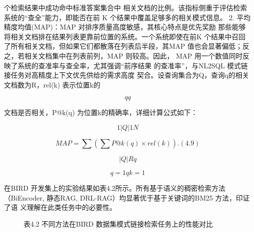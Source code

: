 \documentclass[12pt,a4paper,openright,UTF8]{ctexbook}
\begin{document}
个检索结果中成功命中标准答案集合中 相关文档的比例。该指标侧重于评估检索系统的“查全”能力，即能否在前 K 个结果中覆盖足够多的相关模式信息。 2. 平均精度均值(MAP)：MAP 对排序质量高度敏感，其核心特点是优先奖励 那些能够将相关文档排在结果列表更靠前位置的系统。一个系统即使在前K 个结果中召回了所有相关文档，但如果它们都散落在列表后半段，其MAP 值也会显著偏低；反之，若相关文档集中在列表前列，MAP 则较高。因此， MAP 用一个数值同时反映了系统的查准率与查全率，尤其强调“前序结果 的查准率”，与NL2SQL 模式链接任务对高精度上下文优先供给的需求高度 契合。设查询集合为Q，查询q的相关文档数为R，rel(k) 表示位置k的

\begin{equation*}
qq
\end{equation*}

文档是否相关，P@k(q) 为位置k的精确率，详细计算公式如下：

\begin{equation*}
1|Q| 1N
\end{equation*}

\begin{equation*}
MAP =\sum(\sum P@k(q) \times rel(k)) .(4.9)
\end{equation*}

\begin{equation*}
|Q|Rq
\end{equation*}

\begin{equation*}
q=1qk=1
\end{equation*}

在BIRD 开发集上的实验结果如表4.2所示。所有基于语义的稠密检索方法（BiEncoder, 静态RAG, DRL-RAG）均显著优于基于关键词的BM25 方法，印证了语 义理解在此类任务中的必要性。

\begin{figure}[htbp]
\centering
{}
\caption{表4.2 不同方法在BIRD 数据集模式链接检索任务上的性能对比}
\end{figure}
\end{document}
